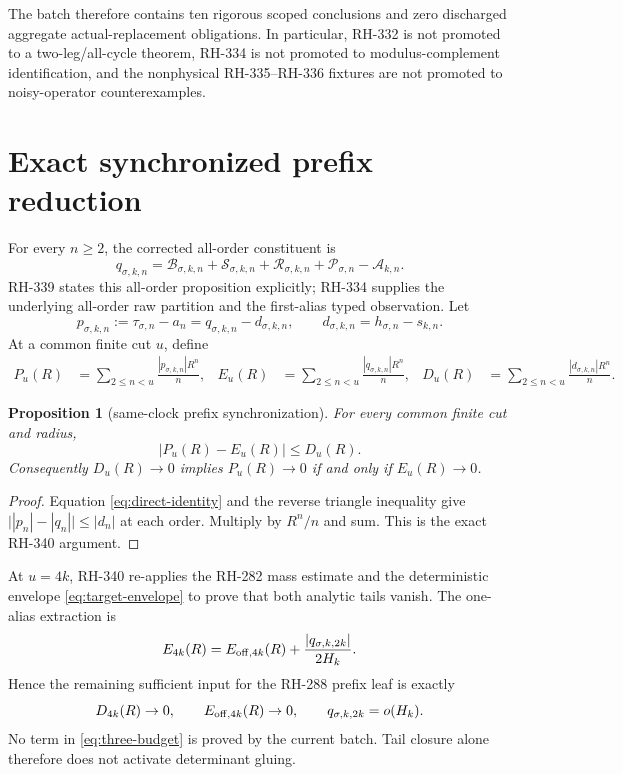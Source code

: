 \documentclass[11pt]{article}
\newtheorem{proposition}[theorem]{Proposition}
\theoremstyle{remark}
\newcommand{\cA}{\mathcal A}
\newcommand{\cB}{\mathcal B}
\newcommand{\cP}{\mathcal P}
\newcommand{\cR}{\mathcal R}
\newcommand{\cS}{\mathcal S}
\begin{document}
The batch therefore contains ten rigorous scoped conclusions and zero
discharged aggregate actual-replacement obligations.  In particular,
RH-332 is not promoted to a two-leg/all-cycle theorem, RH-334 is not promoted
to modulus-complement identification, and the nonphysical RH-335--RH-336
fixtures are not promoted to noisy-operator counterexamples.

\section{Exact synchronized prefix reduction}

For every $n\ge2$, the corrected all-order constituent is
\begin{equation}\label{eq:five-slot}
 q_{\sigma,k,n}
 =\cB_{\sigma,k,n}+\cS_{\sigma,k,n}+\cR_{\sigma,k,n}
  +\cP_{\sigma,n}-\cA_{k,n}.
\end{equation}
RH-339 states this all-order proposition explicitly; RH-334 supplies the
underlying all-order raw partition and the first-alias typed observation.
Let
\begin{equation}\label{eq:direct-identity}
 p_{\sigma,k,n}:=\tau_{\sigma,n}-a_n
 =q_{\sigma,k,n}-d_{\sigma,k,n},
 \qquad d_{\sigma,k,n}=h_{\sigma,n}-s_{k,n}.
\end{equation}
At a common finite cut $u$, define
\begin{align}\label{eq:budgets}
 P_u(R)&=\sum_{2\le n<u}\frac{|p_{\sigma,k,n}|R^n}{n},&
 E_u(R)&=\sum_{2\le n<u}\frac{|q_{\sigma,k,n}|R^n}{n},&
 D_u(R)&=\sum_{2\le n<u}\frac{|d_{\sigma,k,n}|R^n}{n}.
\end{align}

\begin{proposition}[same-clock prefix synchronization]
For every common finite cut and radius,
\begin{equation}\label{eq:sync}
 |P_u(R)-E_u(R)|\le D_u(R).
\end{equation}
Consequently $D_u(R)\to0$ implies
$P_u(R)\to0$ if and only if $E_u(R)\to0$.
\end{proposition}
\begin{proof}
Equation \eqref{eq:direct-identity} and the reverse triangle inequality give
$\bigl||p_n|-|q_n|\bigr|\le|d_n|$ at each order.  Multiply by $R^n/n$ and
sum.  This is the exact RH-340 argument.
\end{proof}

At $u=4k$, RH-340 re-applies the RH-282 mass estimate and the deterministic
envelope \eqref{eq:target-envelope} to prove that both analytic tails vanish.
The one-alias extraction is
\begin{equation}\label{eq:critical-extraction}
 E_{4k}(R)=E_{{\rm off},4k}(R)
 +\frac{|q_{\sigma,k,2k}|}{2H_k}.
\end{equation}
Hence the remaining sufficient input for the RH-288 prefix leaf is exactly
\begin{equation}\label{eq:three-budget}
 D_{4k}(R)\to0,
 \qquad E_{{\rm off},4k}(R)\to0,
 \qquad q_{\sigma,k,2k}=o(H_k).
\end{equation}
No term in \eqref{eq:three-budget} is proved by the current batch.  Tail
closure alone therefore does not activate determinant gluing.
\end{document}
